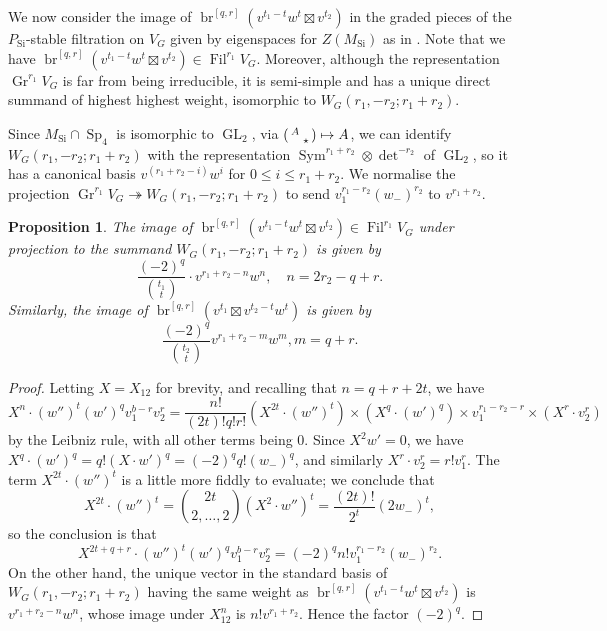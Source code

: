 \documentclass[cjm]{ipart}
\newenvironment{smatrix}{\left( \begin{smallmatrix} } {\end{smallmatrix} \right) }
\newcommand{\stbt}[4]{\begin{smatrix}#1 & #2 \\ #3 & #4\end{smatrix}}
\theoremstyle{plain}
\newtheorem{proposition}[theorem]{Proposition}
\theoremstyle{remark}
\DeclareMathOperator{\br}{br}
\DeclareMathOperator{\Fil}{Fil}
\DeclareMathOperator{\GL}{GL}
\DeclareMathOperator{\Gr}{Gr}
\DeclareMathOperator{\Sieg}{Si}
\DeclareMathOperator{\Sym}{Sym}
\newcommand{\onto}{\twoheadrightarrow}
\numberwithin{equation}{subsection}
\renewcommand{\le}{\leqslant}
\begin{document}
   We now consider the image of $\br^{[q,r]}\left(v^{t_1 -t} w^t \boxtimes v^{t_2}\right)$ in the graded pieces of the $P_{\Sieg}$-stable filtration on $V_G$ given by eigenspaces for $Z(M_{\Sieg})$ as in \cite[Definition 6.1]{LPSZ1}. Note that we have $\br^{[q,r]}\left(v^{t_1 -t} w^t \boxtimes v^{t_2}\right) \in \Fil^{r_1} V_G$. Moreover, although the representation $\Gr^{r_1} V_G$ is far from being irreducible, it is semi-simple and has a unique direct summand of highest highest weight, isomorphic to $W_G(r_1, -r_2; r_1 + r_2)$.


   Since $M_{\Sieg} \cap \operatorname{Sp}_4$ is isomorphic to $\GL_2$, via $\stbt{A}{}{}{\star} \mapsto A$, we can identify $W_G(r_1, -r_2; r_1 + r_2)$ with the representation $\Sym^{r_1 + r_2} \otimes \det^{-r_2}$ of $\GL_2$, so it has a canonical basis $v^{(r_1 +r_2 - i)} w^i$ for $0 \le i \le r_1 + r_2$. We normalise the projection $\Gr^{r_1} V_G \onto W_G(r_1, -r_2; r_1 + r_2)$ to send $v_1^{r_1 - r_2} (w_-)^{r_2}$ to $v^{r_1 + r_2}$.

   \begin{proposition}
    \label{prop:branchingcomparison}
    The image of $\br^{[q,r]}\left(v^{t_1-t} w^t \boxtimes v^{t_2}\right) \in \Fil^{r_1} V_G$ under projection to the summand $W_G(r_1, -r_2; r_1 + r_2)$ is given by
    \[ \frac{(-2)^q}{\binom{t_1}{t}} \cdot v^{r_1 + r_2-n}w^n,\quad n = 2r_2 - q + r.\]
    Similarly, the image of $\br^{[q,r]}\left(v^{t_1} \boxtimes v^{t_2-t} w^t\right)$ is given by
    \[ \frac{(-2)^q}{\binom{t_2}{t}} v^{r_1 + r_2-m}w^m, m = q + r.\]
   \end{proposition}

   \begin{proof}
    Letting $X = X_{12}$ for brevity, and recalling that $n = q + r + 2t$, we have
    \[ X^{n} \cdot (w'')^t (w')^q v_1^{b-r} v_2^r = \frac{n!}{(2t)! q!r!} (X^{2t} \cdot (w'')^t) \times (X^q\cdot  (w')^q) \times v_1^{r_1-r_2-r}\times (X^r \cdot v_2^r) \]
    by the Leibniz rule, with all other terms being 0. Since $X^2 w' = 0$, we have $X^q\cdot  (w')^q = q! (X \cdot w')^q = (-2)^q q! (w_-)^q$, and similarly $X^r \cdot v_2^r = r! v_1^r$. The term $X^{2t} \cdot (w'')^t$ is a little more fiddly to evaluate; we conclude that
    \[ X^{2t} \cdot (w'')^t = \binom{2t}{2, \dots, 2} (X^2 \cdot w'')^t = \frac{(2t)!}{2^t} (2w_-)^t,\]
    so the conclusion is that
    \[ X^{2t+q+r} \cdot (w'')^t (w')^q v_1^{b-r} v_2^r = (-2)^q n!  v_1^{r_1 - r_2} (w_-)^{r_2}.\]
    On the other hand, the unique vector in the standard basis of $W_G(r_1, -r_2; r_1 + r_2)$ having the same weight as $\br^{[q,r]}\left(v^{t_1 -t} w^t \boxtimes v^{t_2}\right)$ is $v^{r_1 + r_2 - n} w^n$, whose image under $X_{12}^n$ is $n! v^{r_1 + r_2}$. Hence the factor $(-2)^q$.
   \end{proof}
\end{document}

